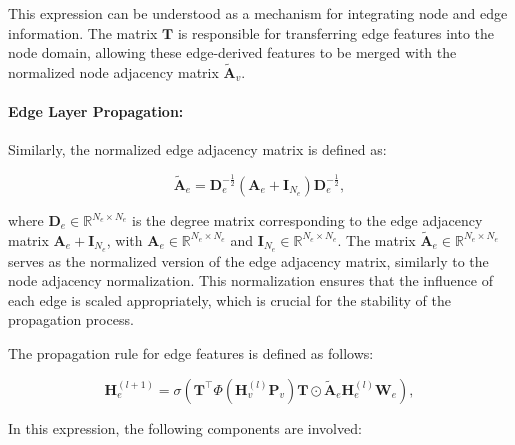 This expression can be understood as a mechanism for integrating node and edge information. The matrix \( \mathbf{T} \) is responsible for transferring edge features into the node domain, allowing these edge-derived features to be merged with the normalized node adjacency matrix \( \tilde{\mathbf{A}}_v \). 


\paragraph{Edge Layer Propagation:}

Similarly, the normalized edge adjacency matrix is defined as:

\begin{equation}
    \tilde{\mathbf{A}}_e = \mathbf{D}_e^{-\frac{1}{2}} \left(\mathbf{A}_e + \mathbf{I}_{N_e}\right) \mathbf{D}_e^{-\frac{1}{2}},
    \label{eq:normalized_edge_adjacency}
\end{equation}




\noindent where \( \mathbf{D}_e \in \mathbb{R}^{N_e \times N_e} \) is the degree matrix corresponding to the edge adjacency matrix \( \mathbf{A}_e + \mathbf{I}_{N_e} \), with \( \mathbf{A}_e \in \mathbb{R}^{N_e \times N_e} \) and \( \mathbf{I}_{N_e} \in \mathbb{R}^{N_e \times N_e} \). The matrix \( \tilde{\mathbf{A}}_e \in \mathbb{R}^{N_e \times N_e} \) serves as the normalized version of the edge adjacency matrix, similarly to the node adjacency normalization. This normalization ensures that the influence of each edge is scaled appropriately, which is crucial for the stability of the propagation process.

The propagation rule for edge features is defined as follows:


\begin{equation}
    \mathbf{H}^{(l+1)}_e = \sigma\left(\mathbf{T}^\top \Phi\left(\mathbf{H}^{(l)}_v \mathbf{P}_v\right) \mathbf{T} \odot \tilde{\mathbf{A}}_e \mathbf{H}^{(l)}_e \mathbf{W}_e\right),
\end{equation}


In this expression, the following components are involved:




